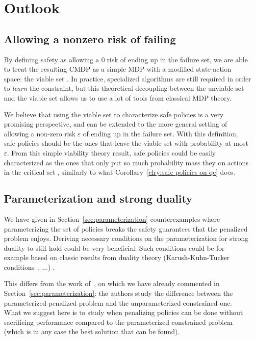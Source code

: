 \section{Outlook}

\subsection{Allowing a nonzero risk of failing} \label{sec:future nonzero}
By defining safety as allowing a $0$ risk of ending up in the failure set, we are able to treat the resulting CMDP as a simple MDP with a modified state-action space: the viable set \QV. In practice, specialized algorithms are still required in order to\emph{ learn} the constraint, but this theoretical decoupling between the unviable set and the viable set allows us to use a lot of tools from classical MDP theory.\par
We believe that using the viable set to characterize safe policies is a very promising perspective, and can be extended to the more general setting of allowing a non-zero risk $\varepsilon$ of ending up in the failure set. With this definition, safe policies should be the ones that leave the viable set with probability at most $\varepsilon$. From this simple viability theory result, safe policies could be easily characterized as the ones that only put so much probability mass they on actions in the critical set \QC, similarly to what Corollary~\ref{clry:safe policies on qc} does.
\subsection{Parameterization and strong duality}
We have given in Section~\ref{sec:parameterization} counterexamples where parameterizing the set of policies breaks the safety guarantees that the penalized problem enjoys. Deriving necessary conditions on the parameterization for strong duality to still hold could be very beneficial. Such conditions could be for example based on classic results from duality theory (Karush-Kuhn-Tucker conditions~\cite{boyd2004convex}, ...) .\par
This differs from the work of~\textcite{paternain2019safe}, on which we have already commented in Section~\ref{sec:parameterization}: the authors study the difference between the parameterized penalized problem and the unparameterized constrained one. What we suggest here is to study when penalizing policies can be done without sacrificing performance compared to the parameterized constrained problem (which is in any case the best solution that can be found).

